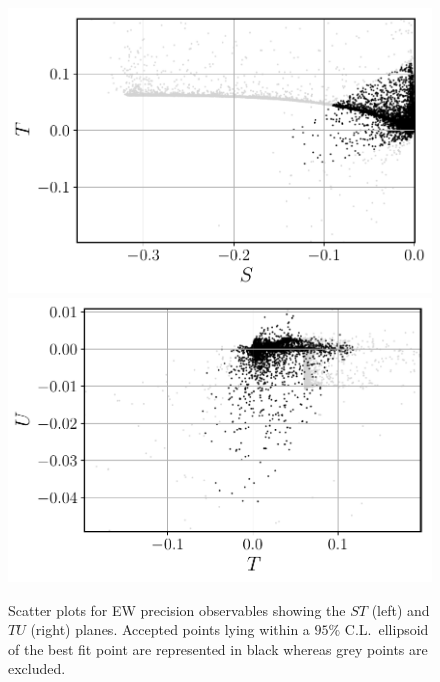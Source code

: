 \documentclass[a4paper,11pt]{article}
\renewcommand{\(}{\left(}
\renewcommand{\)}{\right)}
\renewcommand{\[}{\left[}
\renewcommand{\]}{\right]}
\begin{document}
\begin{figure}[!htb]
	\centering
	\includegraphics[scale=0.5]{ST.pdf}
	\includegraphics[scale=0.5]{TU.pdf}
	\caption{Scatter plots for EW precision observables showing the $ST$ (left) and $TU$ (right) planes. Accepted points lying within a $95\%$ C.L.~ellipsoid of the best fit point are represented in black whereas grey points are excluded.}
	\label{fig:STU}
\end{figure}	
\end{document}
